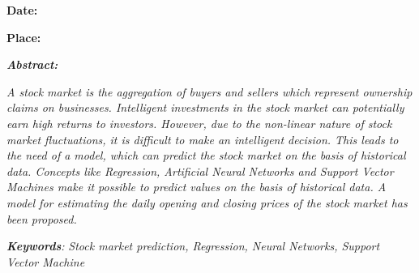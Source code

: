 \documentclass[12pt]{article}
\begin{document}


\vspace{\baselineskip}
\setlength{\parskip}{6.0pt}
{\fontsize{14pt}{16.8pt}\selectfont \textbf{Date:}\par}\par

{\fontsize{14pt}{16.8pt}\selectfont \textbf{Place:}\par}


\newpage
\par

 \par


\vspace{\baselineskip}
{\fontsize{14pt}{16.8pt}\selectfont \textbf{\textit{Abstract:}}\par}\par

\begin{justify}
\textit{\textcolor[HTML]{000009}{A stock market is the aggregation of buyers and sellers which represent ownership claims on businesses. Intelligent investments in the stock market can potentially earn high returns to investors. However, due to the non-linear nature of stock market fluctuations, it is difficult to make an intelligent decision. This leads to the need of a model, which can predict the stock market on the basis of historical data. Concepts like Regression, Artificial Neural Networks and Support Vector Machines make it possible to predict values on the basis of historical data. A model for estimating the daily opening and closing prices of the stock market has been proposed.}}
\end{justify}\par

\begin{justify}
{\fontsize{14pt}{16.8pt}\selectfont \textbf{\textit{ }}\par}
\end{justify}\par

\begin{justify}
{\fontsize{14pt}{16.8pt}\selectfont \textbf{\textit{Keywords}}\textit{:} \textit{\textcolor[HTML]{00000A}{Stock market prediction, Regression, Neural Networks, Support Vector Machine}}\par}
\end{justify}\par
\end{document}
